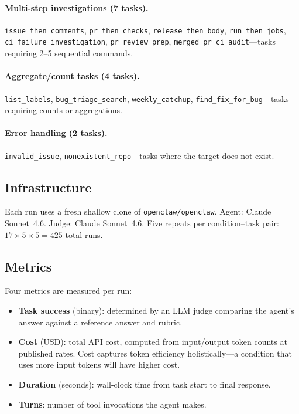 \documentclass{article}
\begin{document}
\paragraph{Multi-step investigations (7 tasks).}
\texttt{issue\_then\_comments}, \texttt{pr\_then\_checks},
\texttt{release\_then\_body}, \texttt{run\_then\_jobs},
\texttt{ci\_failure\_investigation}, \texttt{pr\_review\_prep},
\texttt{merged\_pr\_ci\_audit}---tasks requiring 2--5 sequential commands.

\paragraph{Aggregate/count tasks (4 tasks).}
\texttt{list\_labels}, \texttt{bug\_triage\_search},
\texttt{weekly\_catchup}, \texttt{find\_fix\_for\_bug}---tasks requiring
counts or aggregations.

\paragraph{Error handling (2 tasks).}
\texttt{invalid\_issue}, \texttt{nonexistent\_repo}---tasks where the target
does not exist.

\subsection{Infrastructure}

Each run uses a fresh shallow clone of \texttt{openclaw/openclaw}. Agent:
Claude Sonnet~4.6. Judge: Claude Sonnet~4.6. Five repeats per condition--task
pair: $17 \times 5 \times 5 = 425$ total runs.

\subsection{Metrics}

Four metrics are measured per run:
\begin{itemize}
  \item \textbf{Task success} (binary): determined by an LLM judge comparing
    the agent's answer against a reference answer and rubric.
  \item \textbf{Cost} (USD): total API cost, computed from input/output token
    counts at published rates. Cost captures token efficiency holistically---a
    condition that uses more input tokens will have higher cost.
  \item \textbf{Duration} (seconds): wall-clock time from task start to final
    response.
  \item \textbf{Turns}: number of tool invocations the agent makes.
\end{itemize}
\end{document}

